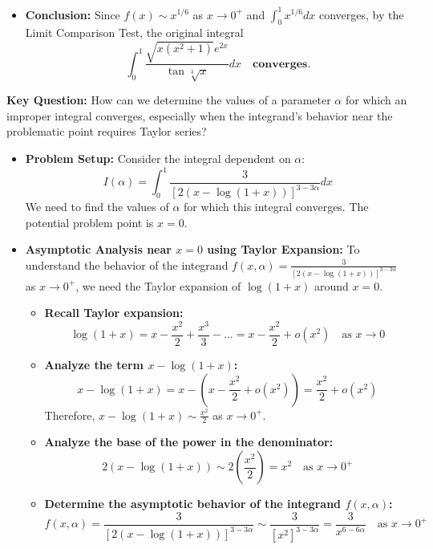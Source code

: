 \begin{cascade}
\begin{itemize}
		\item \textbf{Conclusion:}
		      Since $f(x) \sim x^{1/6}$ as $x \to 0^+$ and $\int_0^1 x^{1/6} dx$ converges, by the Limit Comparison Test, the original integral
		      $$ \int_0^1 \frac{\sqrt{x(x^2+1)} e^{2x}}{\tan \sqrt[3]{x}} dx \quad \textbf{converges.} $$
	\end{itemize}
\end{cascade}

\hfill

\begin{cascade}
	\textbf{Key Question:} How can we determine the values of a parameter $\alpha$ for which an improper integral converges, especially when the integrand's behavior near the problematic point requires Taylor series?

	\begin{itemize}
		\item \textbf{Problem Setup:} Consider the integral dependent on $\alpha$:
		      $$ I(\alpha) = \int_0^1 \frac{3}{[2(x - \log(1+x))]^{3-3\alpha}} dx $$
		      We need to find the values of $\alpha$ for which this integral converges. The potential problem point is $x=0$.

		\item \textbf{Asymptotic Analysis near $x=0$ using Taylor Expansion:}
		      To understand the behavior of the integrand $f(x, \alpha) = \frac{3}{[2(x - \log(1+x))]^{3-3\alpha}}$ as $x \to 0^+$, we need the Taylor expansion of $\log(1+x)$ around $x=0$.
		      \begin{itemize}
			      \item \textbf{Recall Taylor expansion:}
			            $$ \log(1+x) = x - \frac{x^2}{2} + \frac{x^3}{3} - \dots = x - \frac{x^2}{2} + o(x^2) \quad \text{as } x \to 0 $$
			      \item \textbf{Analyze the term $x - \log(1+x)$:}
			            $$ x - \log(1+x) = x - \left( x - \frac{x^2}{2} + o(x^2) \right) = \frac{x^2}{2} + o(x^2) $$
			            Therefore, $x - \log(1+x) \sim \frac{x^2}{2}$ as $x \to 0^+$.
			      \item \textbf{Analyze the base of the power in the denominator:}
			            $$ 2(x - \log(1+x)) \sim 2 \left( \frac{x^2}{2} \right) = x^2 \quad \text{as } x \to 0^+ $$
			      \item \textbf{Determine the asymptotic behavior of the integrand $f(x, \alpha)$:}
			            $$ f(x, \alpha) = \frac{3}{[2(x - \log(1+x))]^{3-3\alpha}} \sim \frac{3}{[x^2]^{3-3\alpha}} = \frac{3}{x^{6-6\alpha}} \quad \text{as } x \to 0^+ $$
		      \end{itemize}


\end{itemize}
\end{cascade}
